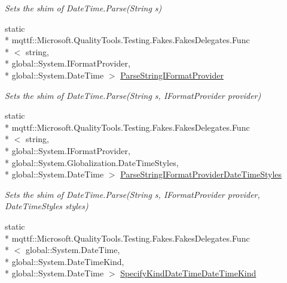 \begin{DoxyCompactItemize}
\begin{DoxyCompactList}\small\item\em Sets the shim of Date\-Time.\-Parse(\-String s)\end{DoxyCompactList}\item 
static \\*
mqttf\-::\-Microsoft.\-Quality\-Tools.\-Testing.\-Fakes.\-Fakes\-Delegates.\-Func\\*
$<$ string, \\*
global\-::\-System.\-I\-Format\-Provider, \\*
global\-::\-System.\-Date\-Time $>$ \hyperlink{class_system_1_1_fakes_1_1_shim_date_time_a824794166e4ccb9388edf5a35be39ce3}{Parse\-String\-I\-Format\-Provider}
\begin{DoxyCompactList}\small\item\em Sets the shim of Date\-Time.\-Parse(\-String s, I\-Format\-Provider provider)\end{DoxyCompactList}\item 
static \\*
mqttf\-::\-Microsoft.\-Quality\-Tools.\-Testing.\-Fakes.\-Fakes\-Delegates.\-Func\\*
$<$ string, \\*
global\-::\-System.\-I\-Format\-Provider, \\*
global\-::\-System.\-Globalization.\-Date\-Time\-Styles, \\*
global\-::\-System.\-Date\-Time $>$ \hyperlink{class_system_1_1_fakes_1_1_shim_date_time_a83196eae71d68ba14cbcb7bc4cbae61a}{Parse\-String\-I\-Format\-Provider\-Date\-Time\-Styles}
\begin{DoxyCompactList}\small\item\em Sets the shim of Date\-Time.\-Parse(\-String s, I\-Format\-Provider provider, Date\-Time\-Styles styles)\end{DoxyCompactList}\item 
static \\*
mqttf\-::\-Microsoft.\-Quality\-Tools.\-Testing.\-Fakes.\-Fakes\-Delegates.\-Func\\*
$<$ global\-::\-System.\-Date\-Time, \\*
global\-::\-System.\-Date\-Time\-Kind, \\*
global\-::\-System.\-Date\-Time $>$ \hyperlink{class_system_1_1_fakes_1_1_shim_date_time_a29dee197913fb7a2d246d065f25e81dd}{Specify\-Kind\-Date\-Time\-Date\-Time\-Kind}

\end{DoxyCompactItemize}
